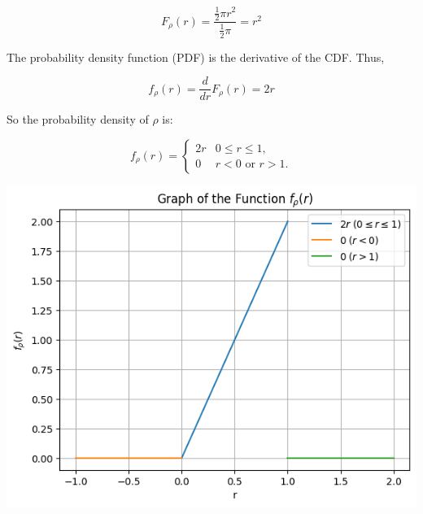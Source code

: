 \[ F_{\rho}(r) = \frac{\frac{1}{2} \pi r^2}{\frac{1}{2} \pi} = r^2 \]

The probability density function (PDF) is the derivative of the CDF. Thus,

\[ f_{\rho}(r) = \frac{d}{dr} F_{\rho}(r) = 2r \]

So the probability density of \(\rho\) is:

\begin{equation}
    f_\rho(r) =
    \begin{cases}
        2r & 0 \leq r \leq 1,         \\
        0  & r < 0 \text{ or } r > 1.
    \end{cases}
\end{equation}

\includegraphics[width=\textwidth]{images/p1.png}